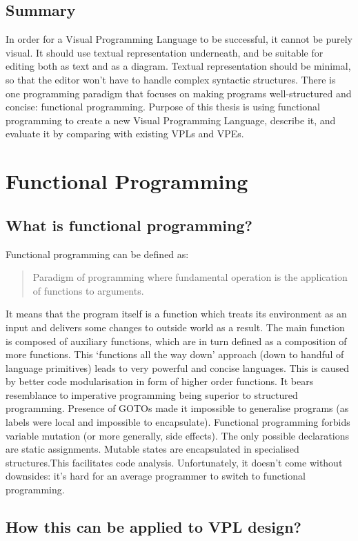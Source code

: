 \documentclass[11pt]{scrartcl}
\begin{document}
\subsection{Summary}
In order for a Visual Programming Language to be successful, it cannot be purely visual. It should use textual representation underneath, and be suitable for editing both as text and as a diagram. Textual representation should be minimal, so that the editor won’t have  to handle complex syntactic structures. There is one programming paradigm that focuses on making programs well-structured and concise: functional programming.
Purpose of this thesis is using functional programming to create a new Visual Programming Language, describe it, and evaluate it by comparing with existing VPLs and VPEs.

\section{Functional Programming}
\subsection{What is functional programming?}
Functional programming can be defined as:
\blockquote[{\cite{Hughes:1989:WFP:63410.63411}}]{Paradigm of programming where fundamental operation is the application of functions to arguments.}
It means that the program itself is a function which treats its environment as an input and delivers some changes to outside world as a result. The main function is composed of auxiliary functions, which are in turn defined as a composition of more functions. This ‘functions all the way down’ approach (down to handful of language primitives) leads to very powerful and concise languages. This is caused by better code modularisation in form of higher order functions. It bears resemblance to imperative programming being superior to structured programming. Presence of GOTOs made it impossible to generalise programs (as labels were local and impossible to encapsulate). Functional programming forbids variable mutation (or more generally, side effects). The only possible declarations are static assignments. Mutable states are encapsulated in specialised structures.This facilitates code analysis. Unfortunately, it doesn’t come without downsides: it’s hard for an average programmer to switch to functional programming.

\subsection{How this can be applied to VPL design?}
\end{document}
